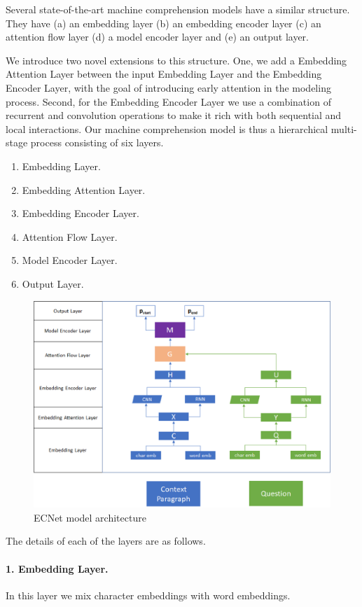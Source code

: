 Several state-of-the-art machine comprehension models have a similar structure. They have (a) an embedding layer (b) an embedding encoder layer (c) an attention flow layer (d) a model encoder layer and (e) an output layer. 

We introduce two novel extensions to this structure.  One, we add a Embedding Attention Layer between the input Embedding Layer and the Embedding Encoder Layer, with the goal of introducing early attention in the modeling process. Second, for the Embedding Encoder Layer we use a combination of recurrent and convolution operations to make it rich with both sequential and local interactions. Our machine comprehension model is thus a hierarchical multi-stage process consisting of six layers. 

\begin{enumerate}
\item Embedding Layer. 
\item Embedding Attention Layer.
\item Embedding Encoder Layer.
\item Attention Flow Layer.
\item Model Encoder Layer.
\item Output Layer.
\end{enumerate}

\begin{figure}[h!]
\centering
	\includegraphics[width=12cm]{Figs4Paper/Model2.eps}
  \caption{ECNet model architecture}
  \label{fig:modelarchitecture}
\end{figure}

The details of each of the layers are as follows.

\paragraph{1. Embedding Layer.} In this layer we mix character embeddings with word embeddings. 


